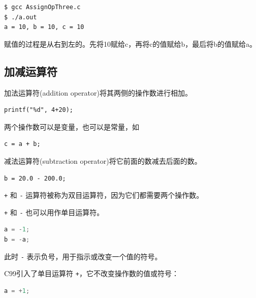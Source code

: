 \begin{frame}[fragile]\ft{\subsecname}

\end{frame}


\begin{frame}[fragile]\ft{\subsecname}
\begin{lstlisting}[backgroundcolor=\color{red!10}]    
$ gcc AssignOpThree.c
$ ./a.out
a = 10, b = 10, c = 10  
\end{lstlisting}

\pause \vspace{.1in}

赋值的过程是从右到左的。先将10赋给c，再将c的值赋给b，最后将b的值赋给a。
\end{frame}

\subsection{加减运算符}
\begin{frame}[fragile]\ft{\subsecname}
加法运算符(addition operator)将其两侧的操作数进行相加。 \vspace{1em}

\begin{lstlisting}
printf("%d", 4+20);
\end{lstlisting}
\vspace{1em}

两个操作数可以是变量，也可以是常量，如
\begin{lstlisting}
c = a + b;
\end{lstlisting}
\end{frame}
 
\begin{frame}[fragile]\ft{\subsecname}
减法运算符(subtraction operator)将它前面的数减去后面的数。\vspace{1em}

\begin{lstlisting}
b = 20.0 - 200.0;
\end{lstlisting}
\vspace{1em}

\lstinline|+| 和 \lstinline|-| 运算符被称为双目运算符，因为它们都需要两个操作数。
\end{frame}


\begin{frame}[fragile]\ft{\subsecname}
\lstinline|+| 和 \lstinline|-| 也可以用作单目运算符。
\vspace{1em}

\begin{lstlisting}[language=c,backgroundcolor=\color{red!10}]
a = -1;
b = -a;
\end{lstlisting}
此时 \lstinline|-| 表示负号，用于指示或改变一个值的符号。
\vspace{1em}

C99引入了单目运算符 \lstinline|+|，它不改变操作数的值或符号：
\begin{lstlisting}[language=c,backgroundcolor=\color{red!10}]
a = +1;
\end{lstlisting}
\end{frame}

